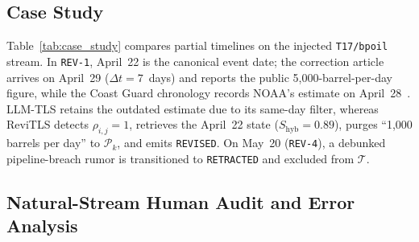 \documentclass[journal]{IEEEtran}
\begin{document}
\subsection{Case Study}
\label{subsec:case_study}

Table~\ref{tab:case_study} compares partial timelines on the injected \texttt{T17/bpoil} stream. In \texttt{REV-1}, April~22 is the canonical event date; the correction article arrives on April~29 ($\Delta t = 7$~days) and reports the public 5,000-barrel-per-day figure, while the Coast Guard chronology records NOAA's estimate on April~28~\cite{uscg2011onscene, sec2012bpflow}. LLM-TLS retains the outdated estimate due to its same-day filter, whereas ReviTLS detects $\rho_{i,j}=1$, retrieves the April~22 state ($S_{\text{hyb}}=0.89$), purges ``1,000 barrels per day'' to $\mathcal{P}_k$, and emits \texttt{REVISED}. On May~20 (\texttt{REV-4}), a debunked pipeline-breach rumor is transitioned to \texttt{RETRACTED} and excluded from $\mathcal{T}$.

\subsection{Natural-Stream Human Audit and Error Analysis}
\label{subsec:error_analysis}
\end{document}
